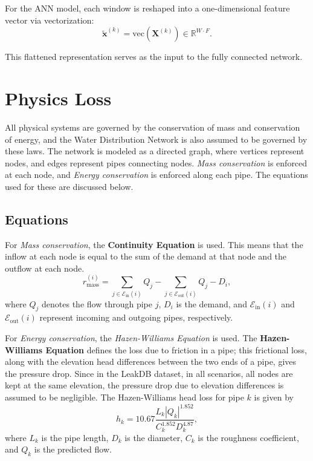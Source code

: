 \documentclass[final,5p,times,twocolumn,authoryear]{elsarticle}
\begin{document}
For the ANN model, each window is reshaped into a one-dimensional feature vector via vectorization:
\begin{equation}
\tilde{\mathbf{x}}^{(k)} =
\mathrm{vec}\left(\mathbf{X}^{(k)}\right)
\in \mathbb{R}^{W \cdot F}.
\end{equation}

This flattened representation serves as the input to the fully connected network.

\section{Physics Loss}
All physical systems are governed by the conservation of mass and conservation of energy, and the Water Distribution Network is also assumed to be governed by these laws. The network is modeled as a directed graph, where vertices represent nodes, and edges represent pipes connecting nodes. \textit{Mass conservation} is enforced at each node, and \textit{Energy conservation} is enforced along each pipe. The equations used for these are discussed below.

\subsection{Equations}
For \textit{Mass conservation}, the \textbf{Continuity Equation} is used. This means that the inflow at each node is equal to the sum of the demand at that node and the outflow at each node.
\[
r^{(i)}_{\mathrm{mass}}
=
\sum_{j \in \mathcal{E}_{\mathrm{in}}(i)} Q_j
-
\sum_{j \in \mathcal{E}_{\mathrm{out}}(i)} Q_j
-
D_i,
\]
where $Q_j$ denotes the flow through pipe $j$, $D_i$ is the demand, and $\mathcal{E}_{\mathrm{in}}(i)$ and $\mathcal{E}_{\mathrm{out}}(i)$ represent incoming and outgoing pipes, respectively.

\vspace{0.3cm}

For \textit{Energy conservation}, the \textit{Hazen-Williams Equation} is used. The \textbf{Hazen-Williams Equation} defines the loss due to friction in a pipe; this frictional loss, along with the elevation head differences between the two ends of a pipe, gives the pressure drop. Since in the LeakDB dataset, in all scenarios, all nodes are kept at the same elevation, the pressure drop due to elevation differences is assumed to be negligible. The Hazen-Williams head loss for pipe $k$ is given by
\[
h_k
=
10.67 \frac{L_k |Q_k|^{1.852}}{C_k^{1.852} D_k^{4.87}},
\]
where $L_k$ is the pipe length, $D_k$ is the diameter, $C_k$ is the roughness coefficient, and $Q_k$ is the predicted flow.
\end{document}
